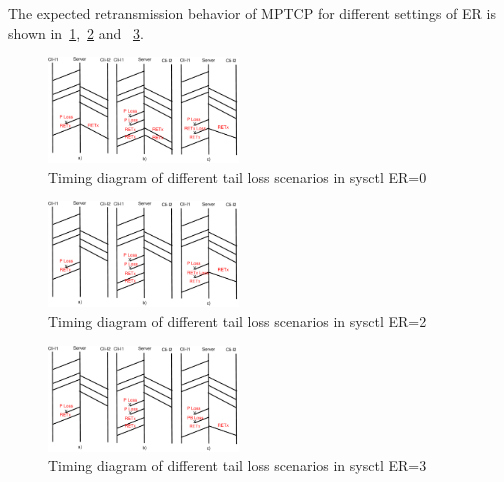 \documentclass[10pt,draftcls,twocolumn]{IEEEconf}
\begin{document}
The expected retransmission behavior of MPTCP for different settings of ER is shown 
in~\ref{timingER0},~\ref{timingER2} and ~\ref{timingER3}.

\begin{figure}[!ht]
\begin{center}
\includegraphics[angle=0, width=0.45\textwidth, natwidth=610, natheight=400]{images/timingER0.pdf}
\end{center}
\caption{Timing diagram of different tail loss scenarios in sysctl ER=0}\label{timingER0}
\end{figure}

\begin{figure}[!ht]
\begin{center}
\includegraphics[angle=0, width=0.45\textwidth, natwidth=610, natheight=400]{images/timingER2.pdf}
\end{center}
\caption{Timing diagram of different tail loss scenarios in sysctl ER=2}\label{timingER2}
\end{figure}

\begin{figure}[!ht]
\begin{center}
\includegraphics[angle=0, width=0.45\textwidth, natwidth=610, natheight=400]{images/timingER3.pdf}
\end{center}
\caption{Timing diagram of different tail loss scenarios in sysctl ER=3}\label{timingER3}
\end{figure}
\end{document}

